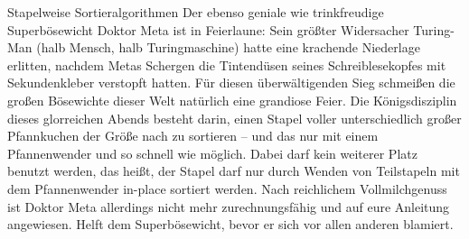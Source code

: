 \begin{frame}{Stapelweise Sortieralgorithmen}
	Der ebenso geniale wie trinkfreudige Superbösewicht Doktor Meta ist in Feierlaune: Sein größter Widersacher Turing-Man {\small (halb Mensch, halb Turingmaschine)} hatte eine krachende Niederlage erlitten, nachdem Metas Schergen die Tintendüsen seines Schreiblesekopfes mit Sekundenkleber verstopft hatten. Für diesen überwältigenden Sieg schmeißen die großen Bösewichte dieser Welt natürlich eine grandiose Feier. Die Königsdisziplin dieses glorreichen Abends besteht darin, einen Stapel voller unterschiedlich großer Pfannkuchen der Größe nach zu sortieren – und das nur mit einem Pfannenwender und so schnell wie möglich. Dabei darf kein weiterer Platz benutzt werden, das heißt, der Stapel darf nur durch Wenden von Teilstapeln mit dem Pfannenwender in-place sortiert werden. Nach reichlichem Vollmilchgenuss ist Doktor Meta allerdings nicht mehr zurechnungsfähig und auf eure Anleitung angewiesen. Helft dem Superbösewicht, bevor er sich vor allen anderen blamiert.
\end{frame}

